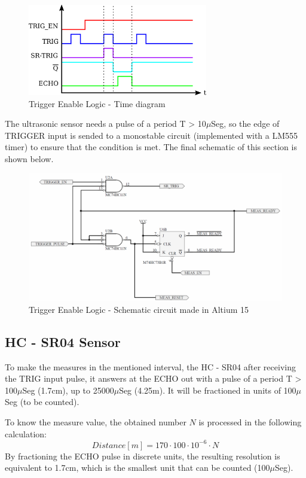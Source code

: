 \begin{figure}[H]
    \begin{centering}
    \includegraphics[width=0.7\textwidth]{trigerEnable_Time}
    \par\end{centering}
    \caption{Trigger Enable Logic - Time diagram}
\end{figure}
\newpage
The ultrasonic sensor needs a pulse of a period T > 10$\mu$Seg, 
so the edge of TRIGGER input is sended to a monostable circuit
(implemented with a LM555 timer) to ensure that the condition is met.
The final schematic of this section is shown below.

\begin{figure}[H]
    \begin{centering}
        \includegraphics[width=1\textwidth]{trig_enable}
    \par\end{centering}
    \caption{Trigger Enable Logic - Schematic circuit made in Altium 15}
\end{figure}

\subsection*{HC - SR04 Sensor}
To make the measures in the mentioned interval, the HC - SR04 
after receiving the TRIG input pulse, it answers at the ECHO out 
with a pulse of a period T > 100$\mu$Seg (1.7cm), up to 25000$\mu$Seg (4.25m).
It will be fractioned in units of 100$\mu$Seg (to be counted).
\par
To know the measure value, the obtained number $N$ is processed in the
following calculation:
\[
    Distance[m] = 170 \cdot 100 \cdot 10^{-6} \cdot N  
\]
By fractioning the ECHO pulse in discrete units, the resulting resolution is
equivalent to 1.7cm, which is the smallest unit that can be counted (100$\mu$Seg).

